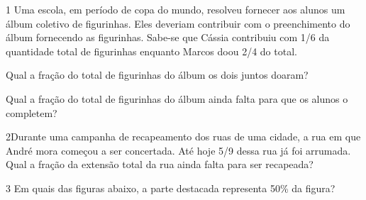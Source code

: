 


\num{1} Uma escola, em período de copa do mundo, resolveu fornecer aos
alunos um álbum coletivo de figurinhas. Eles deveriam contribuir com o
preenchimento do álbum fornecendo as figurinhas. Sabe-se que Cássia
contribuiu com 1/6 da quantidade total de figurinhas enquanto Marcos
doou 2/4 do total.

\begin{escolha}
\item
  Qual a fração do total de figurinhas do álbum os dois juntos doaram?


\item
  Qual a fração do total de figurinhas do álbum ainda falta para que os
  alunos o completem?

\end{escolha}


\num{2}Durante uma campanha de recapeamento dos ruas de uma cidade, a rua
em que André mora começou a ser concertada. Até hoje 5/9 dessa rua já
foi arrumada. Qual a fração da extensão total da rua ainda falta para
ser recapeada?



\num{3} Em quais das figuras abaixo, a parte destacada representa 50\% da
figura?




